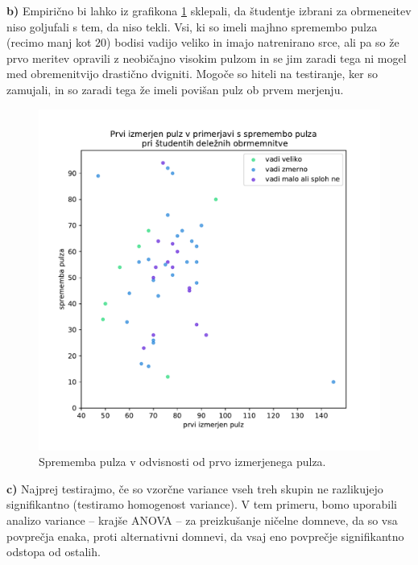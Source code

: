 \documentclass[a4paper,11pt]{article}
\begin{document}
\noindent
\textbf{b)} Empirično bi lahko  iz grafikona \ref{Sprememba pulza v odvisnosti od prvo izmerjenega pulza} sklepali, da študentje izbrani za obrmeneitev niso goljufali s tem, da niso tekli. Vsi, ki so imeli majhno spremembo pulza (recimo manj kot $20$) bodisi vadijo veliko in imajo natrenirano srce, ali pa so že prvo meritev opravili z neobičajno visokim pulzom in se jim zaradi tega ni mogel med obremenitvijo drastično dvigniti. Mogoče so hiteli na testiranje, ker so zamujali, in so zaradi tega že imeli povišan pulz ob prvem merjenju.

\begin{figure}[h]
    \begin{center}
        \includegraphics[scale=0.65]{pulz_vadba.pdf}
        \caption{
            Sprememba pulza v odvisnosti od prvo izmerjenega pulza.
            }
        \label{Sprememba pulza v odvisnosti od prvo izmerjenega pulza}
    \end{center}
\end{figure}

\noindent
\textbf{c)} Najprej testirajmo, če so vzorčne variance vseh treh skupin ne razlikujejo signifikantno (testiramo homogenost variance). V tem primeru, bomo uporabili analizo variance -- krajše ANOVA -- za preizkušanje ničelne domneve, da so vsa povprečja enaka, proti alternativni domnevi, da vsaj eno povprečje signifikantno odstopa od ostalih.
\newline
\end{document}
